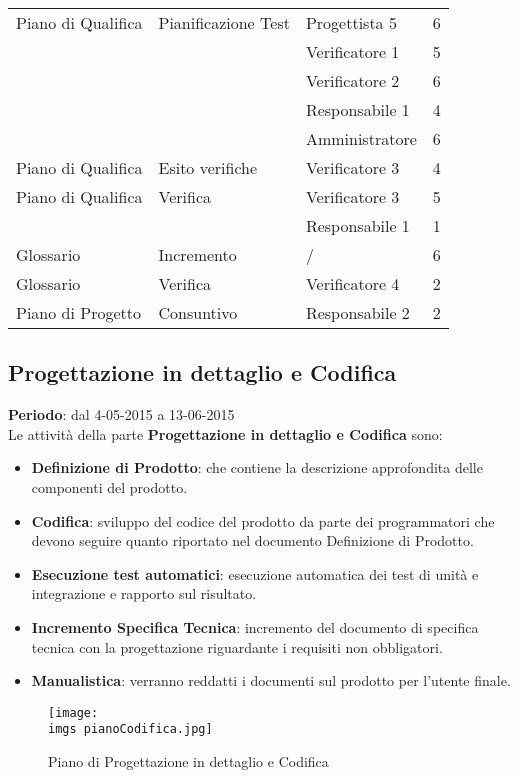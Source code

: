 {{\begin{longtable} [c]{| l | l | l | l |}
		Piano di Qualifica & Pianificazione Test & Progettista 5 & 6\\
		&	&	Verificatore 1 & 5\\
		&	&	Verificatore 2 & 6\\
		&	&	Responsabile 1 & 4\\
		&	&	Amministratore & 6\\
		Piano di Qualifica & Esito verifiche & Verificatore 3 & 4 \\
		Piano di Qualifica & Verifica & Verificatore 3 & 5\\
		&	&	Responsabile 1 & 1\\
		Glossario & Incremento & / & 6 \\
		Glossario & Verifica & Verificatore 4 & 2 \\
		Piano di Progetto & Consuntivo & Responsabile 2 & 2\\
	\end{longtable}
}
\subsection{Progettazione in dettaglio e Codifica}{
	\textbf{Periodo}: dal 4-05-2015 a 13-06-2015 \\
	 
	 Le attività della parte \textbf{Progettazione in dettaglio e Codifica} sono:
	 \begin{itemize}
		 \item \textbf{Definizione di Prodotto}: che contiene la descrizione approfondita delle componenti del prodotto.
		 \item \textbf{Codifica}: sviluppo del codice del prodotto da parte dei programmatori che devono seguire quanto riportato nel documento Definizione di Prodotto.
		 \item \textbf{Esecuzione test automatici}: esecuzione automatica dei test di unità e integrazione e rapporto sul risultato.
		 \item \textbf{Incremento Specifica Tecnica}: incremento del documento di specifica tecnica con la progettazione riguardante i requisiti non obbligatori.
		 \item \textbf{Manualistica}: verranno reddatti i documenti sul prodotto per l'utente finale.
	 \end{itemize}
	
	\begin{figure}[H]
		\texttt{[image: \\imgs pianoCodifica.jpg]}
		\label{fig:pianoprogettazdettcodifica}
		\caption{Piano di Progettazione in dettaglio e Codifica}
	\end{figure}
	
}}

